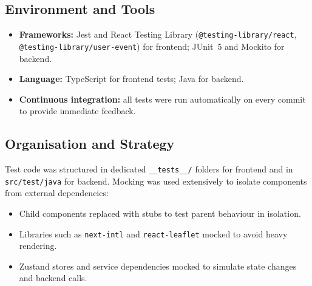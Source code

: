 \subsection{Environment and Tools}
\begin{itemize} \itemsep0pt \parskip0pt
    \item \textbf{Frameworks:} Jest and React Testing Library (\texttt{@testing-library/react}, \texttt{@testing-library/user-event}) for frontend; JUnit~5 and Mockito for backend.
    \item \textbf{Language:} TypeScript for frontend tests; Java for backend.
    \item \textbf{Continuous integration:} all tests were run automatically on every commit to provide immediate feedback.
\end{itemize}

\subsection{Organisation and Strategy}
Test code was structured in dedicated \texttt{\_\_tests\_\_/} folders for frontend and in \texttt{src/test/java} for backend. Mocking was used extensively to isolate components from external dependencies:
\begin{itemize} \itemsep0pt \parskip0pt
    \item Child components replaced with stubs to test parent behaviour in isolation.
    \item Libraries such as \texttt{next-intl} and \texttt{react-leaflet} mocked to avoid heavy rendering.
    \item Zustand stores and service dependencies mocked to simulate state changes and backend calls.
\end{itemize}

